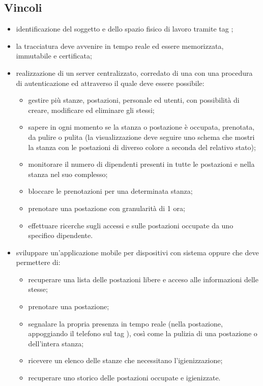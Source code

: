 \subsection{Vincoli}
\begin{itemize}
\item identificazione del soggetto e dello spazio fisico di lavoro tramite tag ;
\item la tracciatura deve avvenire in tempo reale ed essere memorizzata, immutabile e certificata;
\item realizzazione di un server centralizzato, corredato di una  con una procedura di autenticazione ed attraverso il quale deve essere possibile:
\begin{itemize}
\item gestire più stanze, postazioni, personale ed utenti, con possibilità di creare, modificare ed eliminare gli stessi;
\item sapere in ogni momento se la stanza o postazione è occupata, prenotata, da pulire o pulita (la visualizzazione deve seguire uno schema che mostri la stanza con le postazioni di diverso colore a seconda del relativo stato);
\item monitorare il numero di dipendenti presenti in tutte le postazioni e nella stanza nel suo complesso;
\item bloccare le prenotazioni per una determinata stanza;
\item prenotare una postazione con granularità di 1 ora;
\item effettuare ricerche sugli accessi e sulle postazioni occupate da uno specifico dipendente.
\end{itemize}
\item sviluppare un'applicazione mobile per dispositivi con sistema  oppure  che deve permettere di:
\begin{itemize}
\item recuperare una lista delle postazioni libere e acceso alle informazioni delle stesse;
\item prenotare una postazione;
\item segnalare la propria presenza in tempo reale (nella postazione, appoggiando il telefono sul tag ), così come la pulizia di una postazione o dell'intera stanza;
\item ricevere  un  elenco  delle  stanze  che  necessitano l’igienizzazione;
\item recuperare uno storico delle postazioni occupate e igienizzate.
\end{itemize}

\end{itemize}
